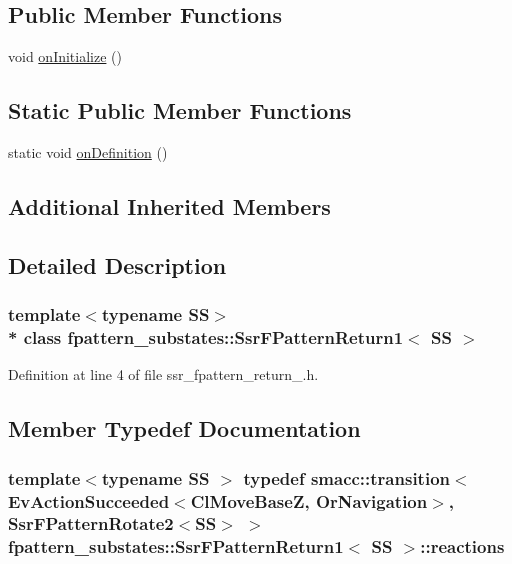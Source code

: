 \subsection*{Public Member Functions}
\begin{DoxyCompactItemize}
\item 
void \hyperlink{structfpattern__substates_1_1SsrFPatternReturn1_a717823642390dd20e05b970aba26926d}{on\+Initialize} ()
\end{DoxyCompactItemize}
\subsection*{Static Public Member Functions}
\begin{DoxyCompactItemize}
\item 
static void \hyperlink{structfpattern__substates_1_1SsrFPatternReturn1_a8a90d897c99b557f678b25bcf59d757d}{on\+Definition} ()
\end{DoxyCompactItemize}
\subsection*{Additional Inherited Members}


\subsection{Detailed Description}
\subsubsection*{template$<$typename SS$>$\\*
class fpattern\+\_\+substates\+::\+Ssr\+F\+Pattern\+Return1$<$ S\+S $>$}



Definition at line 4 of file ssr\+\_\+fpattern\+\_\+return\+\_.\+h.



\subsection{Member Typedef Documentation}
\subsubsection[{\texorpdfstring{reactions}{reactions}}]{\setlength{\rightskip}{0pt plus 5cm}template$<$typename SS $>$ typedef {\bf smacc\+::transition}$<$Ev\+Action\+Succeeded$<$Cl\+Move\+BaseZ, Or\+Navigation$>$, {\bf Ssr\+F\+Pattern\+Rotate2}$<$SS$>$ $>$ {\bf fpattern\+\_\+substates\+::\+Ssr\+F\+Pattern\+Return1}$<$ SS $>$\+::{\bf reactions}}\hypertarget{structfpattern__substates_1_1SsrFPatternReturn1_a40d1cd639b659d850e4bc49a3924773b}{}\label{structfpattern__substates_1_1SsrFPatternReturn1_a40d1cd639b659d850e4bc49a3924773b}


